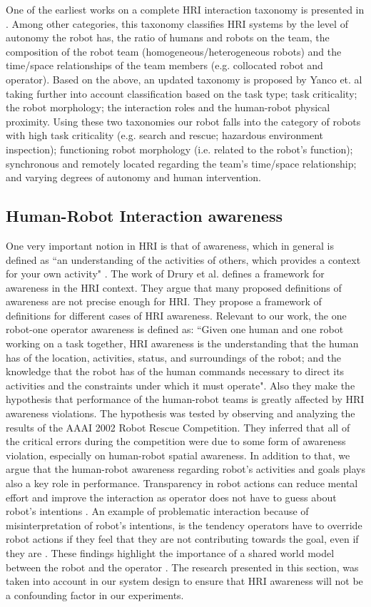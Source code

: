 \documentclass[a4paper,12pt,oneside,openright]{bhamthesis}
\begin{document}
One of the earliest works on a complete HRI interaction taxonomy is presented in \citep{Yanco2002}. Among other categories, this taxonomy classifies HRI systems by the level of autonomy the robot has, the ratio of humans and robots on the team, the composition of the robot team (homogeneous/heterogeneous robots) and the time/space relationships of the team members (e.g. collocated robot and operator). Based on the above, an updated taxonomy is proposed by Yanco et. al \citep{Yanco2004b} taking further into account classification based on the task type; task criticality; the robot morphology; the interaction roles and the human-robot physical proximity. Using these two taxonomies our robot falls into the category of robots with high task criticality (e.g. search and rescue; hazardous environment inspection); functioning robot morphology (i.e. related to the robot's function); synchronous and remotely located regarding the team's time/space relationship; and varying degrees of autonomy and human intervention.

\subsection{Human-Robot Interaction awareness}
One very important notion in HRI is that of awareness, which in general is defined as ``an understanding of the activities of others, which provides a context for your own activity" \citep{Dourish1992}. The work of Drury et al. \citep{Drury2003} defines a framework for awareness in the HRI context. They argue that many proposed definitions of awareness are not precise enough for HRI. They propose a framework of definitions for different cases of HRI awareness. Relevant to our work, the one robot-one operator awareness is defined as: ``Given one human and one robot working on a task together, HRI awareness is the understanding that the human has of the location, activities, status, and surroundings of the robot; and the knowledge that the robot has of the human commands necessary to direct its activities and the constraints under which it must operate". Also they make the hypothesis that performance of the human-robot teams is greatly affected by HRI awareness violations. The hypothesis was tested by observing and analyzing the results of the AAAI 2002 Robot Rescue Competition. They inferred that all of the critical errors during the competition were due to some form of awareness violation, especially on human-robot spatial awareness. In addition to that, we argue that the human-robot awareness regarding robot's activities and goals plays also a key role in performance. Transparency in robot actions can reduce mental effort and improve the interaction as operator does not have to guess about robot's intentions \citep{Goodrich2003}. An example of problematic interaction because of misinterpretation of robot's intentions, is the tendency operators have to override robot actions if they feel that they are not contributing towards the goal, even if they are \citep{Kruijff2012}. These findings highlight the importance of a shared world model between the robot and the operator \citep{Fan2007}. The research presented in this section, was taken into account in our system design to ensure that HRI awareness will not be a confounding factor in our experiments. 
\end{document}
